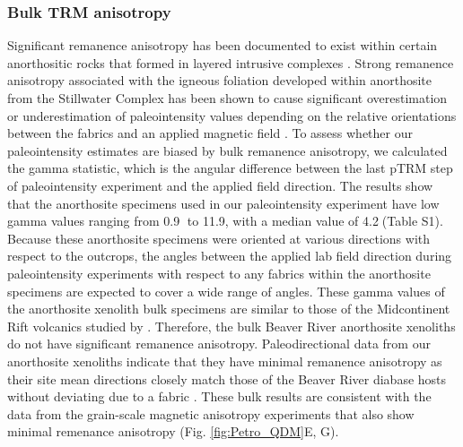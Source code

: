 \documentclass[9pt,twocolumn,twoside,lineno]{pnas-new}
\begin{document}
\subsubsection*{Bulk TRM anisotropy}
Significant remanence anisotropy has been documented to exist within certain anorthositic rocks that formed in layered intrusive complexes \cite{Selkin2000a, Feinberg2006a}. Strong remanence anisotropy associated with the igneous foliation developed within anorthosite from the Stillwater Complex has been shown to cause significant overestimation or underestimation of paleointensity values depending on the relative orientations between the fabrics and an applied magnetic field \cite{Selkin2000a}. To assess whether our paleointensity estimates are biased by bulk remanence anisotropy, we calculated the gamma statistic, which is the angular difference between the last pTRM step of paleointensity experiment and the applied field direction. The results show that the anorthosite specimens used in our paleointensity experiment have low gamma values ranging from 0.9\textdegree$\;$ to 11.9\textdegree, with a median value of 4.2\textdegree$\;$(Table S1). Because these anorthosite specimens were oriented at various directions with respect to the outcrops, the angles between the applied lab field direction during paleointensity experiments with respect to any fabrics within the anorthosite specimens are expected to cover a wide range of angles. These gamma values of the anorthosite xenolith bulk specimens are similar to those of the Midcontinent Rift volcanics studied by \citealp{Sprain2018a}. Therefore, the bulk Beaver River anorthosite xenoliths do not have significant remanence anisotropy. Paleodirectional data from our anorthosite xenoliths indicate that they have minimal remanence anisotropy as their site mean directions closely match those of the Beaver River diabase hosts without deviating due to a fabric \cite{Zhang2021b}. These bulk results are consistent with the data from the grain-scale magnetic anisotropy experiments that also show minimal remenance anisotropy (Fig. \ref{fig:Petro_QDM}E, G). 
\end{document}
